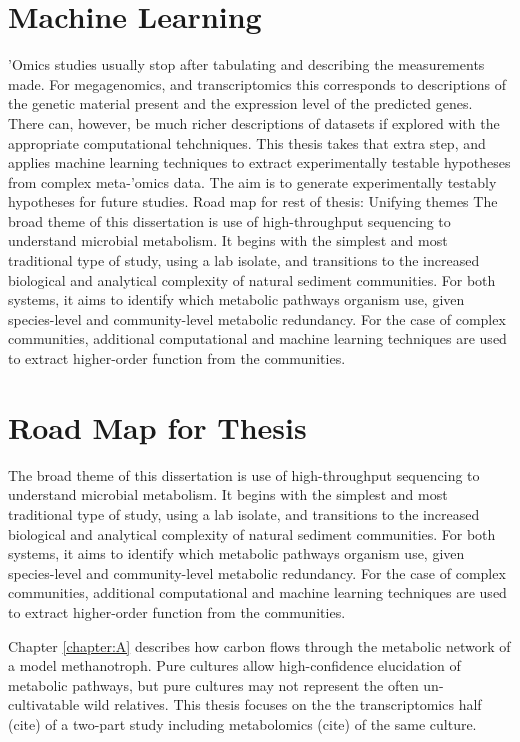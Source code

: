 \section{Machine Learning}
'Omics studies usually stop after tabulating and describing the measurements made.
For megagenomics, and transcriptomics this corresponds to descriptions of the genetic material present and the expression level of the predicted genes.
There can, however, be much richer descriptions of datasets if explored with the appropriate computational tehchniques.
This thesis takes that extra step, and applies machine learning techniques to extract experimentally testable hypotheses from complex meta-'omics data.
The aim is to generate experimentally testably hypotheses for future studies.
Road map for rest of thesis: Unifying themes
The broad theme of this dissertation is use of high-throughput sequencing to understand microbial metabolism.
It begins with the simplest and most traditional type of study, using a lab isolate, and transitions to the increased biological and analytical complexity of natural sediment communities.
For both systems, it aims to identify which metabolic pathways organism use, given species-level and community-level metabolic redundancy.
For the case of complex communities, additional computational and machine learning techniques are used to extract higher-order function from the communities.

\section{Road Map for Thesis} %
The broad theme of this dissertation is use of high-throughput sequencing to understand microbial metabolism.
It begins with the simplest and most traditional type of study, using a lab isolate, and transitions to the increased biological and analytical complexity of natural sediment communities.
For both systems, it aims to identify which metabolic pathways organism use, given species-level and community-level metabolic redundancy.
For the case of complex communities, additional computational and machine learning techniques are used to extract higher-order function from the communities.

Chapter \ref{chapter:A} describes how carbon flows through the metabolic network of a model methanotroph.
Pure cultures allow high-confidence elucidation of metabolic pathways, but pure cultures may not represent the often un-cultivatable wild relatives.
This thesis focuses on the the transcriptomics half (cite) of a two-part study including metabolomics (cite) of the same culture.

